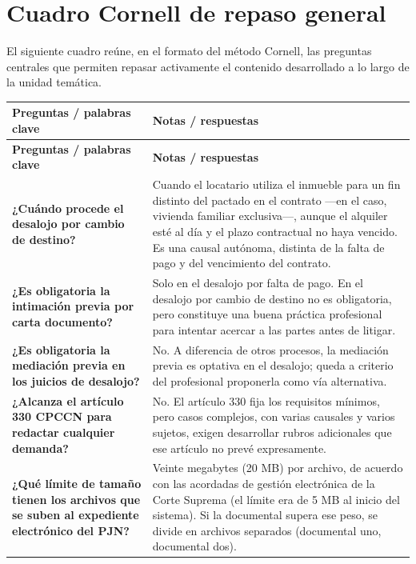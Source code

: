 \documentclass[12pt,oneside]{book}
\begin{document}
\chapter{Cuadro Cornell de repaso general}

El siguiente cuadro reúne, en el formato del método Cornell, las preguntas centrales que permiten repasar activamente el contenido desarrollado a lo largo de la unidad temática.

\begin{longtable}{
    >{\raggedright\arraybackslash}p{}
    >{\raggedright\arraybackslash}p{}
}
\toprule
\textbf{Preguntas / palabras clave} & \textbf{Notas / respuestas} \\
\midrule
\endfirsthead
\toprule
\textbf{Preguntas / palabras clave} & \textbf{Notas / respuestas} \\
\midrule
\endhead

\textbf{¿Cuándo procede el desalojo por cambio de destino?} &
Cuando el locatario utiliza el inmueble para un fin distinto del pactado en el contrato —en el caso, vivienda familiar exclusiva—, aunque el alquiler esté al día y el plazo contractual no haya vencido. Es una causal autónoma, distinta de la falta de pago y del vencimiento del contrato. \\

\textbf{¿Es obligatoria la intimación previa por carta documento?} &
Solo en el desalojo por falta de pago. En el desalojo por cambio de destino no es obligatoria, pero constituye una buena práctica profesional para intentar acercar a las partes antes de litigar. \\

\textbf{¿Es obligatoria la mediación previa en los juicios de desalojo?} &
No. A diferencia de otros procesos, la mediación previa es optativa en el desalojo; queda a criterio del profesional proponerla como vía alternativa. \\

\textbf{¿Alcanza el artículo 330 CPCCN para redactar cualquier demanda?} &
No. El artículo 330 fija los requisitos mínimos, pero casos complejos, con varias causales y varios sujetos, exigen desarrollar rubros adicionales que ese artículo no prevé expresamente. \\

\textbf{¿Qué límite de tamaño tienen los archivos que se suben al expediente electrónico del PJN?} &
Veinte megabytes (20 MB) por archivo, de acuerdo con las acordadas de gestión electrónica de la Corte Suprema (el límite era de 5 MB al inicio del sistema). Si la documental supera ese peso, se divide en archivos separados (documental uno, documental dos). \\


\end{longtable}
\end{document}
